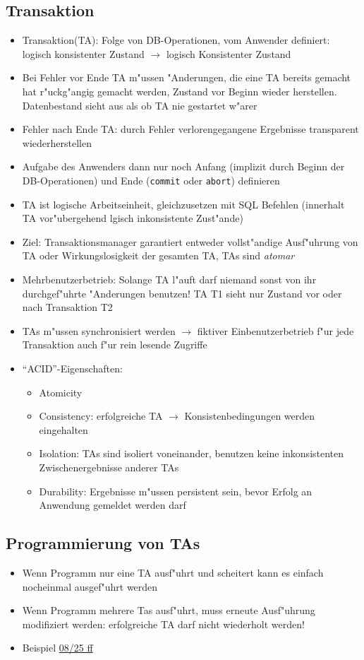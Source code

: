 \documentclass[a4paper, 12pt]{scrartcl}
\begin{document}
\subsection{Transaktion}
\begin{itemize}
	\item
		Transaktion(TA): Folge von DB-Operationen, vom Anwender definiert: logisch konsistenter Zustand $\rightarrow$  logisch Konsistenter Zustand
	\item
		Bei Fehler vor Ende TA m"ussen "Anderungen, die eine TA bereits gemacht hat r"uckg"angig gemacht werden, Zustand vor Beginn wieder herstellen. Datenbestand sieht aus als ob TA nie gestartet w"arer
	\item
		Fehler nach Ende TA: durch Fehler verlorengegangene Ergebnisse transparent wiederherstellen
	\item
		Aufgabe des Anwenders dann nur noch Anfang (implizit durch Beginn der DB-Operationen) und Ende (\lstinline$commit$ oder \lstinline$abort$) definieren
	\item
		TA ist logische Arbeitseinheit, gleichzusetzen mit SQL Befehlen (innerhalt TA vor"ubergehend lgisch inkonsistente Zust"ande)
	\item
		Ziel: Transaktionsmanager garantiert entweder vollst"andige Ausf"uhrung von TA oder Wirkungslosigkeit der gesamten TA, TAs sind \emph{atomar}
	\item
		Mehrbenutzerbetrieb: Solange TA l"auft darf niemand sonst von ihr durchgef"uhrte "Anderungen benutzen! TA T1 sieht nur Zustand vor oder nach Transaktion T2
	\item
		TAs m"ussen synchronisiert werden $\rightarrow$  fiktiver Einbenutzerbetrieb f"ur jede Transaktion auch f"ur rein lesende Zugriffe
	\item
		\enquote{ACID}-Eigenschaften:
		\begin{itemize}
			\item
				Atomicity
			\item
				Consistency: erfolgreiche TA $\rightarrow$ Konsistenbedingungen werden eingehalten
			\item
				Isolation: TAs sind isoliert voneinander, benutzen keine inkonsistenten Zwischenergebnisse anderer TAs
			\item
				Durability: Ergebnisse m"ussen persistent sein, bevor Erfolg an Anwendung gemeldet werden darf
		\end{itemize}
\end{itemize}

\subsection{Programmierung von TAs}
\begin{itemize}
	\item
		Wenn Programm nur eine TA ausf"uhrt und scheitert kann es einfach nocheinmal ausgef"uhrt werden
	\item
		Wenn Programm mehrere Tas ausf"uhrt, muss erneute Ausf"uhrung modifiziert werden: erfolgreiche TA darf nicht wiederholt werden!
	\item
		Beispiel \href{site:IDB-2015WS-08-Transaktionen.pdf}{08/25 ff}
\end{itemize}
\end{document}
